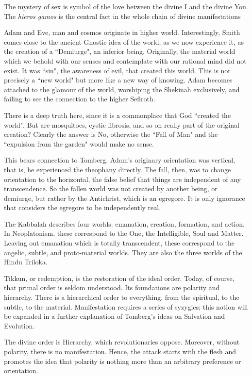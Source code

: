The mystery of sex is symbol of the love between the divine I and the divine You. The \emph{hieros gamos} is the central fact in the whole chain of divine manifestations

Adam and Eve, man and cosmos originate in higher world. Interestingly, Smith comes close to the ancient Gnostic idea of the world, as we now experience it, as the creation of a ``Demiurge", an inferior being. Originally, the material world which we behold with our senses and contemplate with our rational mind did not exist. It was ``sin", the awareness of evil, that created this world. This is not precisely a ``new world" but more like a new way of knowing. Adam becomes attached to the glamour of the world, worshiping the Shekinah exclusively, and failing to see the connection to the higher Sefiroth.

There is a deep truth here, since it is a commonplace that God ``created the world". But are mosquitoes, cystic fibrosis, and so on really part of the original creation? Clearly the answer is No, otherwise the ``Fall of Man" and the ``expulsion from the garden" would make no sense.

This bears connection to Tomberg. Adam's originary orientation was vertical, that is, he experienced the theophany directly. The fall, then, was to change orientation to the horizontal, the false belief that things are independent of any transcendence. So the fallen world was not created by another being, or demiurge, but rather by the Antichrist, which is an egregore. It is only ignorance that considers the egregore to be independently real.

The Kabbalah describes four worlds: emanation, creation, formation, and action. In Neoplatonism, these correspond to the One, the Intelligible, Soul and Matter. Leaving out emanation which is totally transcendent, these correspond to the angelic, subtle, and proto-material worlds. They are also the three worlds of the Hindu Triloka.

Tikkun, or redemption, is the restoration of the ideal order. Today, of course, that primal order is seldom understood. Its foundations are polarity and hierarchy. There is a hierarchical order to everything, from the spiritual, to the subtle, to the material. Manifestation requires a series of syzygies; this notion will be expanded in a further explanation of Tomberg's ideas on Salvation and Evolution.

The divine order is Hierarchy, which revolutionaries oppose. Moreover, without polarity, there is no manifestation. Hence, the attack starts with the flesh and promotes the idea that polarity is nothing more than an arbitrary preference or orientation.

